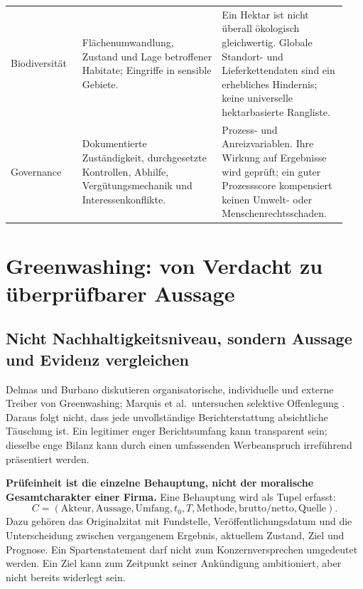 \documentclass[11pt,a4paper]{article}
\begin{document}
\begin{longtable}{@{}P{0.20\linewidth}P{0.39\linewidth}P{0.35\linewidth}@{}}
Biodiversität & Flächenumwandlung, Zustand und Lage betroffener Habitate; Eingriffe in sensible Gebiete. & Ein Hektar ist nicht überall ökologisch gleichwertig. Globale Standort- und Lieferkettendaten sind ein erhebliches Hindernis; keine universelle hektarbasierte Rangliste. \\
Governance & Dokumentierte Zuständigkeit, durchgesetzte Kontrollen, Abhilfe, Vergütungsmechanik und Interessenkonflikte. & Prozess- und Anreizvariablen. Ihre Wirkung auf Ergebnisse wird geprüft; ein guter Prozessscore kompensiert keinen Umwelt- oder Menschenrechtsschaden. \\
\bottomrule
\end{longtable}
\normalsize

\section{Greenwashing: von Verdacht zu überprüfbarer Aussage}
\label{sec:greenwashing}
\subsection{Nicht Nachhaltigkeitsniveau, sondern Aussage und Evidenz vergleichen}
Delmas und Burbano diskutieren organisatorische, individuelle und externe Treiber von Greenwashing; Marquis et al.\ untersuchen selektive Offenlegung \cite{delmas2011,marquis2016}. Daraus folgt nicht, dass jede unvollständige Berichterstattung absichtliche Täuschung ist. Ein legitimer enger Berichtsumfang kann transparent sein; dieselbe enge Bilanz kann durch einen umfassenden Werbeanspruch irreführend präsentiert werden.

\textbf{Prüfeinheit ist die einzelne Behauptung, nicht der moralische Gesamtcharakter einer Firma.} Eine Behauptung wird als Tupel erfasst:
\begin{equation}
C=(\text{Akteur},\text{Aussage},\text{Umfang},t_0,T,\text{Methode},\text{brutto/netto},\text{Quelle}).
\end{equation}
Dazu gehören das Originalzitat mit Fundstelle, Veröffentlichungsdatum und die Unterscheidung zwischen vergangenem Ergebnis, aktuellem Zustand, Ziel und Prognose. Ein Spartenstatement darf nicht zum Konzernversprechen umgedeutet werden. Ein Ziel kann zum Zeitpunkt seiner Ankündigung ambitioniert, aber nicht bereits widerlegt sein.
\end{document}
